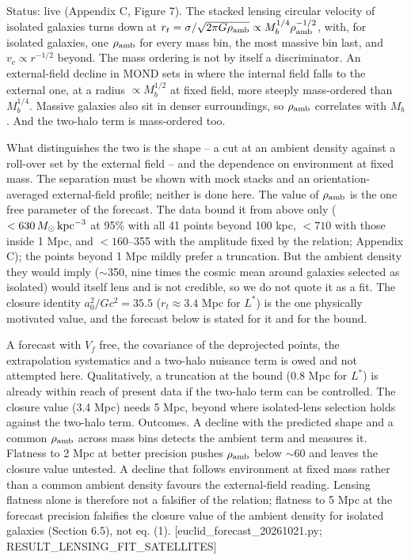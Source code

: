\documentclass[
  10pt,
]{article}
\begin{document}
Status: live (Appendix C, Figure 7). The stacked lensing circular velocity of isolated galaxies turns down at $r_t=\sigma/\sqrt{2\pi G\rho_{\rm amb}}\propto M_b^{1/4}\rho_{\rm amb}^{-1/2}$, with, for isolated galaxies, one $\rho_{\rm amb}$ for every mass bin, the most massive bin last, and $v_c\propto r^{-1/2}$ beyond. The mass ordering is not by itself a discriminator. An external-field decline in MOND sets in where the internal field falls to the external one, at a radius $\propto M_b^{1/2}$ at fixed field, more steeply mass-ordered than $M_b^{1/4}$. Massive galaxies also sit in denser surroundings, so $\rho_{\rm amb}$ correlates with $M_b$. And the two-halo term is mass-ordered too.

What distinguishes the two is the shape -- a cut at an ambient density against a roll-over set by the external field -- and the dependence on environment at fixed mass. The separation must be shown with mock stacks and an orientation-averaged external-field profile; neither is done here. The value of $\rho_{\rm amb}$ is the one free parameter of the forecast. The data bound it from above only ($<630\,M_\odot\,{\rm kpc}^{-3}$ at 95\% with all 41 points beyond 100 kpc, $<710$ with those inside 1 Mpc, and $<160$--355 with the amplitude fixed by the relation; Appendix C); the points beyond 1 Mpc mildly prefer a truncation. But the ambient density they would imply ($\sim$350, nine times the cosmic mean around galaxies selected as isolated) would itself lens and is not credible, so we do not quote it as a fit. The closure identity $a_0^2/Gc^2=35.5$ ($r_t\approx3.4$ Mpc for $L^*$) is the one physically motivated value, and the forecast below is stated for it and for the bound.

A forecast with $V_f$ free, the covariance of the deprojected points, the extrapolation systematics and a two-halo nuisance term is owed and not attempted here. Qualitatively, a truncation at the bound (0.8 Mpc for $L^*$) is already within reach of present data if the two-halo term can be controlled. The closure value (3.4 Mpc) needs 5 Mpc, beyond where isolated-lens selection holds against the two-halo term. Outcomes. A decline with the predicted shape and a common $\rho_{\rm amb}$ across mass bins detects the ambient term and measures it. Flatness to 2 Mpc at better precision pushes $\rho_{\rm amb}$ below $\sim$60 and leaves the closure value untested. A decline that follows environment at fixed mass rather than a common ambient density favours the external-field reading. Lensing flatness alone is therefore not a falsifier of the relation; flatness to 5 Mpc at the forecast precision falsifies the closure value of the ambient density for isolated galaxies (Section 6.5), not eq. (1). {[}euclid\_forecast\_20261021.py; RESULT\_LENSING\_FIT\_SATELLITES{]}
\end{document}
